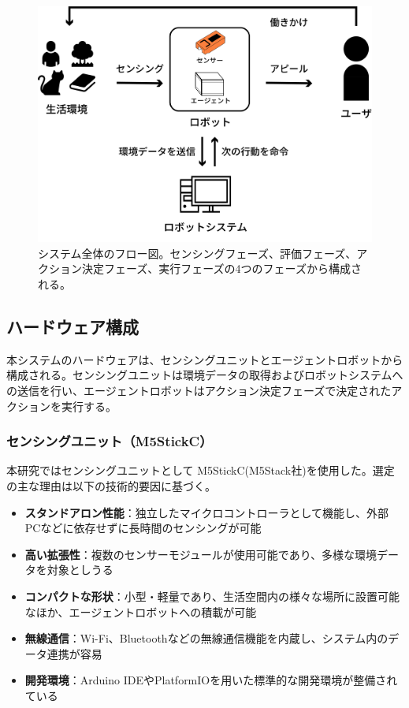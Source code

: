 \documentclass{cuxarticle}
\begin{document}
\begin{figure}[h]
  \centering
  \includegraphics[keepaspectratio, height=0.3\textheight]{resources/system-flow.png}
  \caption[short]{システム全体のフロー図。センシングフェーズ、評価フェーズ、アクション決定フェーズ、実行フェーズの4つのフェーズから構成される。}
  \label{fig:system-flow}
\end{figure}

\subsection{ハードウェア構成}
本システムのハードウェアは、センシングユニットとエージェントロボットから構成される。センシングユニットは環境データの取得およびロボットシステムへの送信を行い、エージェントロボットはアクション決定フェーズで決定されたアクションを実行する。

\subsubsection{センシングユニット（M5StickC）}
本研究ではセンシングユニットとして M5StickC(M5Stack社)\cite{--M5StickC}を使用した。選定の主な理由は以下の技術的要因に基づく。

\begin{itemize}
  \item \textbf{スタンドアロン性能}：独立したマイクロコントローラとして機能し、外部PCなどに依存せずに長時間のセンシングが可能
  \item \textbf{高い拡張性}：複数のセンサーモジュールが使用可能であり、多様な環境データを対象としうる
  \item \textbf{コンパクトな形状}：小型・軽量であり、生活空間内の様々な場所に設置可能なほか、エージェントロボットへの積載が可能
  \item \textbf{無線通信}：Wi-Fi、Bluetoothなどの無線通信機能を内蔵し、システム内のデータ連携が容易
  \item \textbf{開発環境}：Arduino IDEやPlatformIOを用いた標準的な開発環境が整備されている
\end{itemize}
\end{document}
